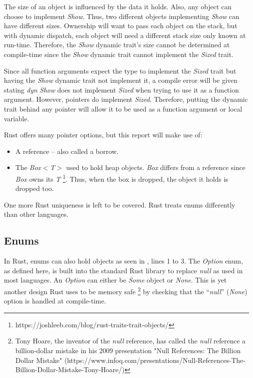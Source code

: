 The size of an object is influenced by the data it holds.
Also, any object can choose to implement \textit{Show}.
Thus, two different objects implementing \textit{Show} can have different sizes.
Ownership will want to pass each object on the stack, but with dynamic dispatch, each object will need a different stack size only known at run-time.
Therefore, the \textit{Show} dynamic trait's size cannot be determined at compile-time since the \textit{Show} dynamic trait cannot implement the \textit{Sized} trait.

Since all function arguments expect the type to implement the \textit{Sized} trait but having the \textit{Show} dynamic trait not implement it, a compile error will be given stating \textit{dyn Show} does not implement \textit{Sized} when trying to use it as a function argument.
However, pointers do implement \textit{Sized}.
Therefore, putting the dynamic trait behind any pointer will allow it to be used as a function argument or local variable.


Rust offers many pointer options\cite{klabnik_2019_01}, but this report will make use of:
\begin{itemize}
	\item A reference -- also called a borrow.
	\item The \textit{Box$<$T$>$} used to hold heap objects.
	      \textit{Box} differs from a reference since \textit{Box} owns its \textit{T} \footnote{https://joshleeb.com/blog/rust-traits-trait-objects/}.
	      Thus, when the box is dropped, the object it holds is dropped too.
\end{itemize}

One more Rust uniqueness is left to be covered. Rust treats enums differently than other languages.

\subsection{Enums}
In Rust, enums can also hold objects \cite{klabnik_2019_01} as seen in , lines 1 to 3.
The \textit{Option} enum, as defined here, is built into the standard Rust library \cite{klabnik_2019_01} to replace \textit{null} as used in most languages.
An \textit{Option} can either be \textit{Some} object or \textit{None}.
This is yet another design Rust uses to be memory safe \footnote{Tony Hoare, the inventor of the \textit{null} reference, has called the \textit{null} reference a billion-dollar mistake in his 2009 presentation "Null References: The Billion Dollar Mistake" (https://www.infoq.com/presentations/Null-References-The-Billion-Dollar-Mistake-Tony-Hoare/)} by checking that the ``\textit{null}'' (\textit{None}) option is handled at compile-time.

